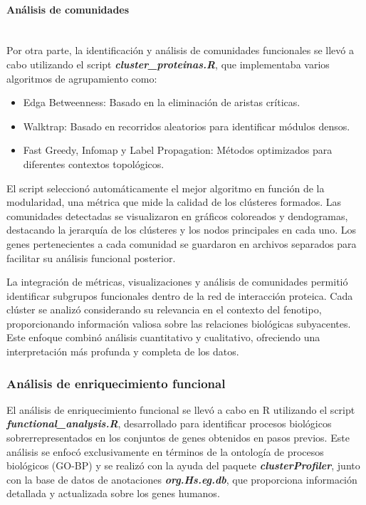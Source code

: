 \paragraph{Análisis de comunidades} \mbox{}\\

Por otra parte, la identificación y análisis de comunidades funcionales se llevó a cabo utilizando el script \textbf{\textit{cluster\_proteinas.R}}, que implementaba varios algoritmos de agrupamiento como:

\begin{itemize}
	\item Edga Betweenness: Basado en la eliminación de aristas críticas.
	\item Walktrap: Basado en recorridos aleatorios para identificar módulos densos.
	\item Fast Greedy, Infomap y Label Propagation: Métodos optimizados para diferentes contextos topológicos.
\end{itemize}

El script seleccionó automáticamente el mejor algoritmo en función de la modularidad, una métrica que mide la calidad de los clústeres formados. Las comunidades detectadas se visualizaron en gráficos coloreados y dendogramas, destacando la jerarquía de los clústeres y los nodos principales en cada uno. Los genes pertenecientes a cada comunidad se guardaron en archivos separados para facilitar su análisis funcional posterior.

La integración de métricas, visualizaciones y análisis de comunidades permitió identificar subgrupos funcionales dentro de la red de interacción proteica. Cada clúster se analizó considerando su relevancia en el contexto del fenotipo, proporcionando información valiosa sobre las relaciones biológicas subyacentes. Este enfoque combinó análisis cuantitativo y cualitativo, ofreciendo una interpretación más profunda y completa de los datos.

\subsubsection{Análisis de enriquecimiento funcional}

El análisis de enriquecimiento funcional se llevó a cabo en R utilizando el script \textbf{\textit{functional\_analysis.R}}, desarrollado para identificar procesos biológicos sobrerrepresentados en los conjuntos de genes obtenidos en pasos previos. Este análisis se enfocó exclusivamente en términos de la ontología de procesos biológicos (GO-BP) y se realizó con la ayuda del paquete \textbf{\textit{clusterProfiler}}, junto con la base de datos de anotaciones \textbf{\textit{org.Hs.eg.db}}, que proporciona información detallada y actualizada sobre los genes humanos.

